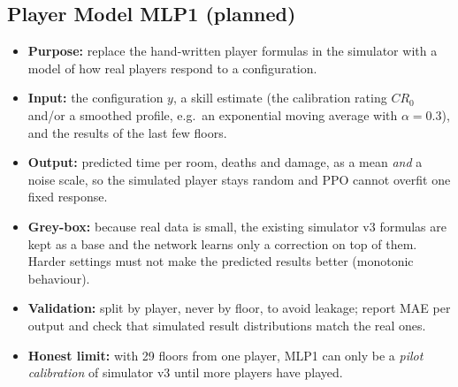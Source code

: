 \subsection{Player Model MLP1 (planned)}
\begin{itemize}
    \item \textbf{Purpose:} replace the hand-written player formulas in the simulator with a model of how real players respond to a configuration.
    \item \textbf{Input:} the configuration $y$, a skill estimate (the calibration rating $CR_0$ and/or a smoothed profile, e.g.\ an exponential moving average with $\alpha = 0.3$), and the results of the last few floors.
    \item \textbf{Output:} predicted time per room, deaths and damage, as a mean \emph{and} a noise scale, so the simulated player stays random and PPO cannot overfit one fixed response.
    \item \textbf{Grey-box:} because real data is small, the existing simulator v3 formulas are kept as a base and the network learns only a correction on top of them. Harder settings must not make the predicted results better (monotonic behaviour).
    \item \textbf{Validation:} split by player, never by floor, to avoid leakage; report MAE per output and check that simulated result distributions match the real ones.
    \item \textbf{Honest limit:} with 29 floors from one player, MLP1 can only be a \emph{pilot calibration} of simulator v3 until more players have played.
\end{itemize}

